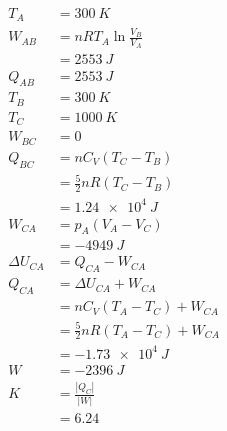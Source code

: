 \documentclass{article}
\begin{document}
\begin{align*}
  T_A           & = \qty{300}{K}                         \\
  W_{AB}        & = n R T_A \ln \frac{V_B}{V_A}          \\
                & = \qty{2553}{J}                        \\
  Q_{AB}        & = \qty{2553}{J}                        \\
  T_B           & = \qty{300}{K}                         \\
  T_C           & = \qty{1000}{K}                        \\
  W_{BC}        & = 0                                    \\
  Q_{BC}        & = n C_V (T_C - T_B)                    \\
                & = \frac{5}{2} n R (T_C - T_B)          \\
                & = \qty{1.24e4}{J}                      \\
  W_{CA}        & = p_A (V_A - V_C)                      \\
                & = \qty{-4949}{J}                       \\
  \Delta U_{CA} & = Q_{CA} - W_{CA}                      \\
  Q_{CA}        & = \Delta U_{CA} + W_{CA}               \\
                & = n C_V (T_A - T_C) + W_{CA}           \\
                & = \frac{5}{2} n R (T_A - T_C) + W_{CA} \\
                & = \qty{-1.73e4}{J}                     \\
  W             & = \qty{-2396}{J}                       \\
  K             & = \frac{|Q_C|}{|W|}                    \\
                & = 6.24
\end{align*}

\setcounter{subsubsection}{50}
\subsubsection{}
\end{document}
